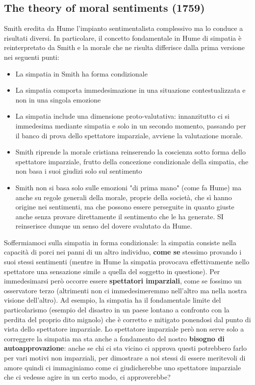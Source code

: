 \documentclass[10pt,a4paper]{article}
\begin{document}
\subsection{The theory of moral sentiments (1759)}
Smith eredita da Hume l'impianto sentimentalista complessivo ma lo conduce a risultati diversi.
In particolare, il concetto fondamentale in Hume di simpatia è reinterpretato da Smith e la morale che ne risulta differisce dalla prima versione nei seguenti punti:
\begin{itemize}
	\item La simpatia in Smith ha forma condizionale
	\item La simpatia comporta immedesimazione in una situazione contestualizzata e non in una singola emozione
	\item La simpatia include una dimensione proto-valutativa: innanzitutto ci si immedesima mediante simpatia e solo in un secondo momento, passando per il banco di prova dello spettatore imparziale, avviene la valutazione morale.
	\item Smith riprende la morale cristiana reinserendo la coscienza sotto forma dello spettatore imparziale, frutto della concezione condizionale della simpatia, che non basa i suoi giudizi solo sul sentimento
	\item Smith non si basa solo sulle emozioni "di prima mano" (come fa Hume) ma anche su regole generali della morale, proprie della società, che sì hanno origine nei sentimenti, ma che possono essere perseguite in quanto giuste anche senza provare direttamente il sentimento che le ha generate. SI reinserisce dunque un senso del dovere svalutato da Hume.
\end{itemize}
Soffermiamoci sulla simpatia in forma condizionale: la simpatia consiste nella capacità di porci nei panni di un altro individuo, \textbf{come se} stessimo provando i suoi stessi sentimenti (mentre in Hume la simpatia provocava effettivamente nello spettatore una sensazione simile a quella del soggetto in questione). Per immedesimarsi però occorre essere \textbf{spettatori imparziali}, come se fossimo un osservatore terzo (altrimenti non ci immedesimeremmo nell'altro ma nella nostra visione dell'altro). Ad esempio, la simpatia ha il fondamentale limite del particolarismo (esempio del disastro in un paese lontano a confronto con la perdita del proprio dito mignolo) che è corretto e mitigato ponendosi dal punto di vista dello spettatore imparziale. Lo spettatore imparziale però non serve solo a correggere la simpatia ma sta anche a fondamento del nostro \textbf{bisogno di autoapprovazione}: anche se chi ci sta vicino ci approva questi potrebbero farlo per vari motivi non imparziali, per dimostrare a noi stessi di essere meritevoli di amore quindi ci immaginiamo come ci giudicherebbe uno spettatore imparziale che ci vedesse agire in un certo modo, ci approverebbe?\\
\end{document}
